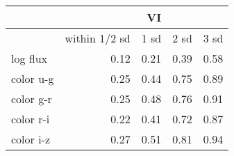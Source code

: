 \begin{tabular}{lrrrr}
{} &  &  \textbf{VI} &  & \\
\toprule
{} & within 1/2 sd &  1 sd &  2 sd &  3 sd \\
\midrule
log flux &         0.12 & 0.21 & 0.39 & 0.58 \\
color u-g   &         0.25 & 0.44 & 0.75 & 0.89 \\
color g-r   &         0.25 & 0.48 & 0.76 & 0.91 \\
color r-i   &         0.22 & 0.41 & 0.72 & 0.87 \\
color i-z   &         0.27 & 0.51 & 0.81 & 0.94 \\
\bottomrule
\end{tabular}

